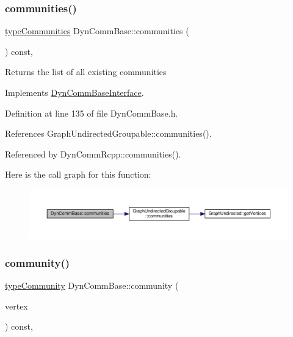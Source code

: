 \subsubsection{\texorpdfstring{communities()}{communities()}}
{\footnotesize\ttfamily \hyperlink{graphUndirectedGroupable_8h_ab79c7252155ca17cb49aa0b1fea30116}{type\+Communities} Dyn\+Comm\+Base\+::communities (\begin{DoxyParamCaption}{ }\end{DoxyParamCaption}) const\hspace{0.3cm}{\ttfamily [inline]}, {\ttfamily [virtual]}}

\begin{DoxyReturn}{Returns}
the list of all existing communities 
\end{DoxyReturn}


Implements \hyperlink{classDynCommBaseInterface_aedba7e43ae301ab910340f1d766d1698}{Dyn\+Comm\+Base\+Interface}.



Definition at line 135 of file Dyn\+Comm\+Base.\+h.



References Graph\+Undirected\+Groupable\+::communities().



Referenced by Dyn\+Comm\+Rcpp\+::communities().

Here is the call graph for this function\+:\nopagebreak
\begin{figure}[H]
\begin{center}
\leavevmode
\includegraphics[width=350pt]{classDynCommBase_a064d9909a91cfe25acf05e6bd1fc967d_cgraph}
\end{center}
\end{figure}
\mbox{\label{classDynCommBase_a651753518a2de4ea52caea518e74d878}} 
\subsubsection{\texorpdfstring{community()}{community()}}
{\footnotesize\ttfamily \hyperlink{graphUndirectedGroupable_8h_a914da95c9ea7f14f4b7f875c36818556}{type\+Community} Dyn\+Comm\+Base\+::community (\begin{DoxyParamCaption}\item[{\hyperlink{edge_8h_a5fbd20c46956d479cb10afc9855223f6}{type\+Vertex}}]{vertex }\end{DoxyParamCaption}) const\hspace{0.3cm}{\ttfamily [inline]}, {\ttfamily [virtual]}}


